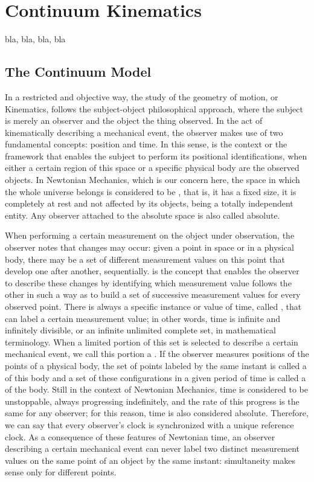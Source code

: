\chapter{Continuum Kinematics}

bla, bla, bla, bla


\section{The Continuum Model}


In a restricted and objective way, the study of the geometry of motion, or Kinematics, follows the subject-object philosophical approach, where the subject is merely an observer and the object the thing observed. In the act of kinematically describing a mechanical event, the observer makes use of two fundamental concepts: position and time. In this sense,  is the context or the framework that enables the subject to perform its positional identifications, when either a certain region of this space or a specific physical body are the observed objects. In Newtonian Mechanics, which is our concern here, the space in which the whole universe belongs is considered to be , that is, it has a fixed size, it is completely at rest and not affected by its objects, being a totally independent entity. Any observer attached to the absolute space is also called absolute. 

When performing a certain measurement on the object under observation, the observer notes that changes may occur: given a point in space or in a physical body, there may be a set of different measurement values on this point that develop one after another, sequentially.  is the concept that enables the observer to describe these changes by identifying which measurement value follows the other in such a way as to build a set of successive measurement values for every observed point. There is always a specific instance or value of time, called , that can label a certain measurement value; in other words, time is infinite and infinitely divisible, or an infinite unlimited complete set, in mathematical terminology. When a limited portion of this set is selected to describe a certain mechanical event, we call this portion a . If the observer measures positions of the points of a physical body, the set of points labeled by the same instant is called a  of this body and a set of these configurations in a given period of time is called a  of the body. Still in the context of Newtonian Mechanics, time is considered to be unstoppable, always progressing indefinitely, and the rate of this progress is the same for any observer; for this reason, time is also considered absolute. Therefore, we can say that every observer's clock is synchronized with a unique reference clock. As a consequence of these features of Newtonian time, an observer describing a certain mechanical event can never label two distinct measurement values on the same point of an object by the same instant: simultaneity makes sense only for different points. 

